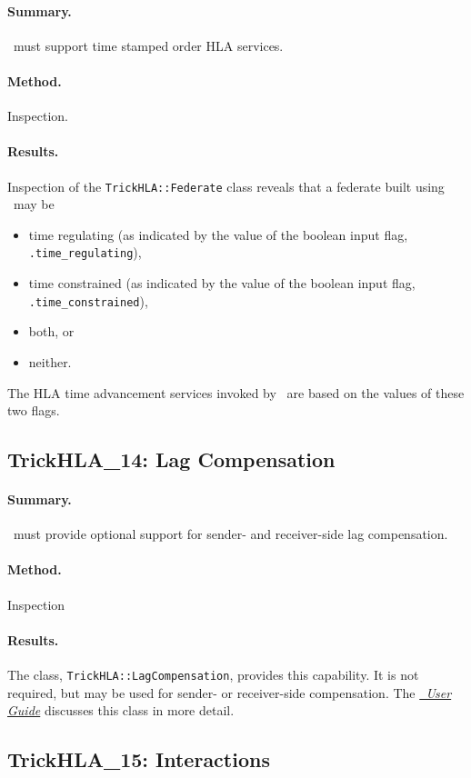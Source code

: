 \paragraph{Summary.}
\TrickHLA\ must support time stamped order HLA services.
\paragraph{Method.} Inspection.
\paragraph{Results.}
Inspection of the {\tt TrickHLA::Federate} class reveals that a federate
built using \TrickHLA\ may be
\begin{itemize}
\item{time regulating (as indicated by the value of the boolean input flag,
  {\tt .time\_regulating}),
}
\item{time constrained (as indicated by the value of the boolean input flag,
  {\tt .time\_constrained}),
}
\item{both, or }
\item{neither.}
\end{itemize}
The HLA time advancement services invoked by \TrickHLA\ are based on the values
of these two flags.

\subsection{TrickHLA\_14: Lag Compensation}
\paragraph{Summary.}
\TrickHLA\ must provide optional support for sender- and receiver-side
lag compensation.
\paragraph{Method.} Inspection
\paragraph{Results.}
The class, {\tt TrickHLA::LagCompensation}, provides this capability.
It is not required, but may be used for sender- or receiver-side
compensation.
The \href{file:TrickHLAUser.pdf} {\em \TrickHLA\ User Guide}
discusses this class in more detail.

\subsection{TrickHLA\_15: Interactions}
